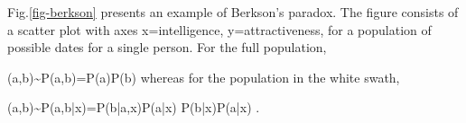 Fig.\ref{fig-berkson}
presents an example
of Berkson's paradox. The
figure consists of
a scatter plot
with axes x=intelligence,
y=attractiveness, 
for a population of 
possible dates for a single person. 
For the full population,

\beq
(a,b)\sim P(a,b)=P(a)P(b)
\eeq
whereas for the population
in the white swath,

\beq
(a,b)\sim P(a,b|x)=P(b|a,x)P(a|x)\neq
P(b|x)P(a|x)
\;.
\eeq



